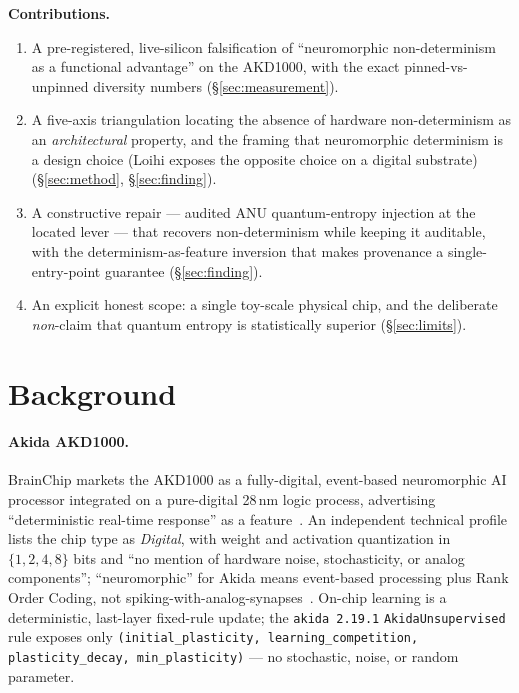 \documentclass[11pt,a4paper]{article}
\begin{document}
\medskip
\noindent\textbf{Contributions.}
\begin{enumerate}\itemsep0.3em
\item A pre-registered, live-silicon falsification of ``neuromorphic
non-determinism as a functional advantage'' on the AKD1000, with the exact
pinned-vs-unpinned diversity numbers (\S\ref{sec:measurement}).
\item A five-axis triangulation locating the absence of hardware
non-determinism as an \emph{architectural} property, and the framing that
neuromorphic determinism is a design choice (Loihi exposes the opposite
choice on a digital substrate) (\S\ref{sec:method}, \S\ref{sec:finding}).
\item A constructive repair --- audited ANU quantum-entropy injection at the
located lever --- that recovers non-determinism while keeping it auditable,
with the determinism-as-feature inversion that makes provenance a
single-entry-point guarantee (\S\ref{sec:finding}).
\item An explicit honest scope: a single toy-scale physical chip, and the
deliberate \emph{non}-claim that quantum entropy is statistically superior
(\S\ref{sec:limits}).
\end{enumerate}

\section{Background}
\label{sec:bg}

\paragraph{Akida AKD1000.} BrainChip markets the AKD1000 as a fully-digital,
event-based neuromorphic AI processor integrated on a pure-digital 28\,nm
logic process, advertising ``deterministic real-time response'' as a
feature~\cite{brainchipAKD1000Brief,brainchipCommercialization}. An
independent technical profile lists the chip type as \emph{Digital}, with
weight and activation quantization in \(\{1,2,4,8\}\) bits and ``no mention
of hardware noise, stochasticity, or analog components''; ``neuromorphic''
for Akida means event-based processing plus Rank Order Coding, not
spiking-with-analog-synapses~\cite{openNeuromorphicAkida}. On-chip learning
is a deterministic, last-layer fixed-rule update; the \texttt{akida 2.19.1}
\texttt{AkidaUnsupervised} rule exposes only
\texttt{(initial\_plasticity, learning\_competition, plasticity\_decay,
min\_plasticity)} --- no stochastic, noise, or random parameter.
\end{document}
